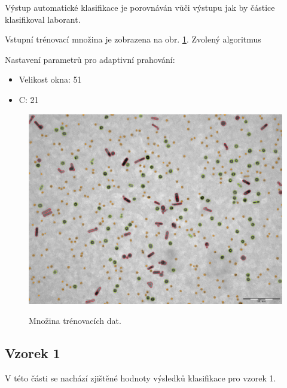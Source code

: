 \documentclass[11pt,twoside,a4paper,table]{book}
\begin{document}
Výstup automatické klasifikace je porovnáván vůči výstupu jak by částice klasifikoval laborant.

Vstupní trénovací množina je zobrazena na obr. \ref{fig:class_input}. Zvolený algoritmus

Nastavení parametrů pro adaptivní prahování:
\begin{itemize}
	\item Velikost okna: 51
	\item C: 21
\end{itemize}

\begin{figure}[h!]
	\centering
	\includegraphics[width=\textwidth]{figures/multi5_klasifikace.png}
	\label{fig:class_input}
	\caption{Množina trénovacích dat.}
\end{figure}

\newpage
\FloatBarrier
\subsection{Vzorek 1}
V této části se nachází zjištěné hodnoty výsledků klasifikace pro vzorek 1.
\end{document}

